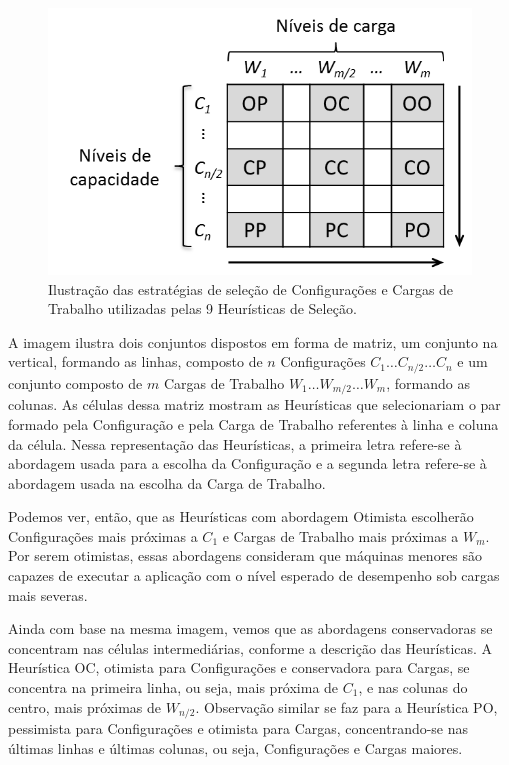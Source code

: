 \begin{figure}[t]
  \begin{center}
    \includegraphics[scale=.8]{img/heuristics}
  \end{center}
  \caption{\label{fig:heuristicas}Ilustração das estratégias de seleção de Configurações e Cargas de Trabalho utilizadas pelas 9 Heurísticas de Seleção.}
\end{figure}

A imagem ilustra dois conjuntos dispostos em forma de matriz, um conjunto 
na vertical, formando as linhas, composto de $n$ Configurações $C_1 \ldots C_{n/2} 
\ldots C_n$ e um conjunto composto de $m$ Cargas de Trabalho $W_1 \ldots W_{m/2} 
\ldots W_m$, formando as colunas. As células dessa matriz mostram as Heurísticas
que selecionariam o par formado pela Configuração e pela Carga de Trabalho referentes
à linha e coluna da célula. Nessa representação das Heurísticas, a primeira letra
refere-se à abordagem usada para a escolha da Configuração e a segunda letra refere-se 
à abordagem usada na escolha da Carga de Trabalho.
 
Podemos ver, então, que as Heurísticas com abordagem Otimista escolherão Configurações 
mais próximas a $C_1$ e Cargas de Trabalho mais próximas a $W_m$. Por serem otimistas, essas 
abordagens consideram que máquinas menores são capazes de executar a aplicação com o nível esperado de desempenho sob cargas 
mais severas.

Ainda com base na mesma imagem, vemos que as abordagens conservadoras se concentram
nas células intermediárias, conforme a descrição das Heurísticas. A Heurística
OC, otimista para Configurações e conservadora para Cargas, se concentra na 
primeira linha, ou seja, mais próxima de $C_1$, e nas colunas do centro, mais
próximas de $W_{n/2}$. Observação similar se faz para a Heurística PO, pessimista 
para Configurações e otimista para Cargas, concentrando-se nas últimas linhas e 
últimas colunas, ou seja, Configurações e Cargas maiores.

